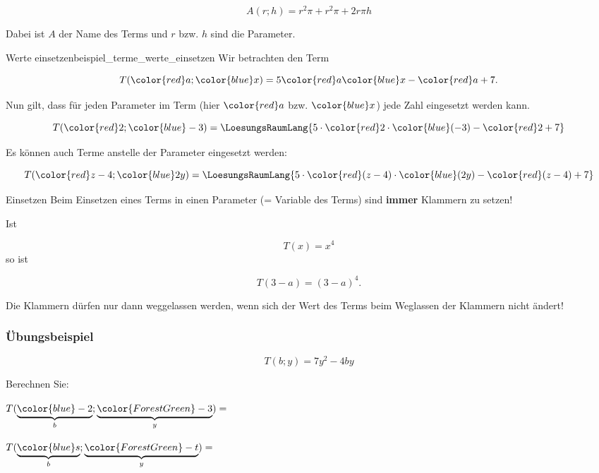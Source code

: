 $$A(r; h) = r^2\pi + r^2\pi + 2r\pi{}h$$

Dabei ist $A$ der Name des Terms und $r$ bzw. $h$ sind die Parameter.
\vspace{3mm}
\begin{beispiel}{Werte einsetzen}{beispiel_terme_werte_einsetzen}
  Wir betrachten den Term

  $$T({\color{red}a}; {\color{blue}x}) = 5{\color{red}a}{\color{blue}x} - {\color{red}a} + 7.$$

  Nun gilt, dass für jeden Parameter im Term (hier ${\color{red}a}$
  bzw. ${\color{blue}x}$) jede Zahl eingesetzt
  werden kann.\leserluft{}

  $$T({\color{red}2}; {\color{blue}-3}) = \LoesungsRaumLang{5\cdot{}{\color{red}2}\cdot{\color{blue}(-3)} - {\color{red}2} + 7}$$

  Es können auch Terme anstelle der Parameter eingesetzt
  werden:\leserluft{}

  $$T({\color{red}z-4}; {\color{blue}2y}) =
  \LoesungsRaumLang{5 \cdot{} {\color{red}(z-4)} \cdot {\color{blue}(2y)} - {\color{red}(z-4)} + 7}$$
\end{beispiel}

\begin{gesetz}{Einsetzen}{}
  Beim Einsetzen eines Terms in einen
  Parameter (= Variable des Terms) sind \textbf{immer} Klammern zu setzen!

  Ist
  
  $$ T(x) = x^4$$
  so ist
  
  $$ T(3-a) = (3-a)^4.$$
  
Die Klammern dürfen nur dann weggelassen werden, wenn sich der Wert
des Terms beim Weglassen der Klammern nicht ändert!
\end{gesetz}
\newpage

\subsubsection{Übungsbeispiel}
$$T(b; y) = 7y^2 - 4by$$

Berechnen Sie:


$T(\underbrace{{\color{blue}-2}}_b; \underbrace{{\color{ForestGreen}-3}}_y) = $%




$T(\underbrace{{\color{blue}s}}_b; \underbrace{{\color{ForestGreen}-t}}_y) = $%


